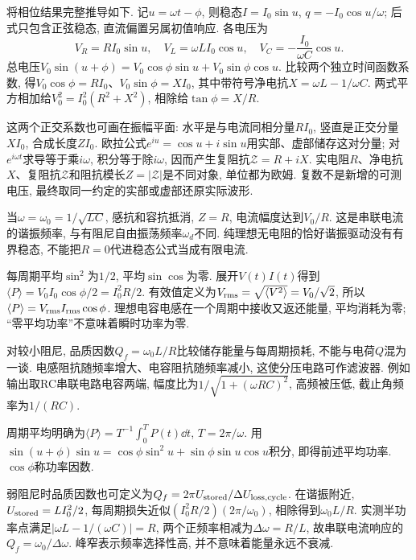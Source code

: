 将相位结果完整推导如下. 记$u=\omega t-\phi$, 则稳态$I=I_0\sin u$, $q=-I_0\cos u/\omega$; 后式只包含正弦稳态, 直流偏置另属初值响应. 各电压为
\[
V_R=RI_0\sin u,\quad V_L=\omega LI_0\cos u,\quad V_C=-\frac{I_0}{\omega C}\cos u.
\]
总电压$V_0\sin(u+\phi)=V_0\cos\phi\sin u+V_0\sin\phi\cos u$. 比较两个独立时间函数系数, 得$V_0\cos\phi=RI_0$、$V_0\sin\phi=XI_0$, 其中带符号净电抗$X=\omega L-1/\omega C$. 两式平方相加给$V_0^2=I_0^2(R^2+X^2)$, 相除给$\tan\phi=X/R$.

这两个正交系数也可画在振幅平面: 水平是与电流同相分量$RI_0$, 竖直是正交分量$XI_0$, 合成长度$ZI_0$. 欧拉公式$e^{iu}=\cos u+i\sin u$用实部、虚部储存这对分量; 对$e^{i\omega t}$求导等于乘$i\omega$, 积分等于除$i\omega$, 因而产生复阻抗$\mathcal Z=R+iX$. 实电阻$R$、净电抗$X$、复阻抗$\mathcal Z$和阻抗模长$Z=|\mathcal Z|$是不同对象, 单位都为欧姆. 复数不是新增的可测电压, 最终取同一约定的实部或虚部还原实际波形.

当$\omega=\omega_0=1/\sqrt{LC}$, 感抗和容抗抵消, $Z=R$, 电流幅度达到$V_0/R$. 这是串联电流的谐振频率, 与有阻尼自由振荡频率$\omega_d$不同. 纯理想无电阻的恰好谐振驱动没有有界稳态, 不能把$R=0$代进稳态公式当成有限电流.

每周期平均$\sin^2$为$1/2$, 平均$\sin\cos$为零. 展开$V(t)I(t)$得到$\langle P\rangle=V_0I_0\cos\phi/2=I_0^2R/2$. 有效值定义为$V_{\rm rms}=\sqrt{\langle V^2\rangle}=V_0/\sqrt2$, 所以$\langle P\rangle=V_{\rm rms}I_{\rm rms}\cos\phi$. 理想电容电感在一个周期中接收又返还能量, 平均消耗为零; “零平均功率”不意味着瞬时功率为零.

对较小阻尼, 品质因数$Q_f=\omega_0L/R$比较储存能量与每周期损耗, 不能与电荷$Q$混为一谈. 电感阻抗随频率增大、电容阻抗随频率减小, 这使分压电路可作滤波器. 例如输出取RC串联电路电容两端, 幅度比为$1/\sqrt{1+(\omega RC)^2}$, 高频被压低, 截止角频率为$1/(RC)$.


周期平均明确为$\langle P\rangle=T^{-1}\int_0^TP(t)\dd t$, $T=2\pi/\omega$. 用$\sin(u+\phi)\sin u=\cos\phi\sin^2u+\sin\phi\sin u\cos u$积分, 即得前述平均功率. $\cos\phi$称功率因数.

弱阻尼时品质因数也可定义为$Q_f=2\pi U_{\rm stored}/\Delta U_{\rm loss,cycle}$. 在谐振附近,$U_{\rm stored}=LI_0^2/2$, 每周期损失近似$(I_0^2R/2)(2\pi/\omega_0)$, 相除得到$\omega_0L/R$. 实测半功率点满足$|\omega L-1/(\omega C)|=R$, 两个正频率相减为$\Delta\omega=R/L$, 故串联电流响应的$Q_f=\omega_0/\Delta\omega$. 峰窄表示频率选择性高, 并不意味着能量永远不衰减.
